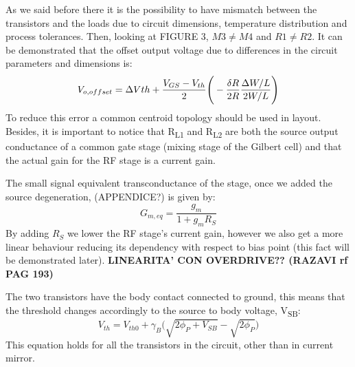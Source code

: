 As we said before there it is the possibility to have mismatch between the transistors and the loads due to circuit dimensions, temperature distribution and process tolerances. Then, looking at FIGURE 3, $M3 \neq M4$ and $R1 \neq R2$. It can be demonstrated that the offset output voltage due to differences in the circuit parameters and dimensions is:
\begin{equation}
V_{o,offset}= \Delta V{th}+\frac{V_{GS}-V_{th}}{2}\Bigg(-\frac{\delta R}{2R}\frac{\Delta W /L}{2W/L}\Bigg) \notag
\end{equation}
To reduce this error a common centroid topology should be used in layout.
Besides, it is important to notice that R\textsubscript{L1} and R\textsubscript{L2} are both the source output conductance of a common gate stage (mixing stage of the Gilbert cell) and that the actual gain for the RF stage is a current gain. 

The small signal equivalent transconductance of the stage, once we added the source degeneration, (APPENDICE?) is given by:
\begin{equation}
\label{eq_degenGain}
G_{m,eq} = \frac{g_m}{1+g_m R_S}
\end{equation}
By adding $R_S$ we lower the RF stage's current gain, however  we also get a more linear behaviour reducing its dependency with respect to bias point (this fact will be demonstrated later). \textbf{LINEARITA' CON OVERDRIVE?? (RAZAVI rf PAG 193)}

The two transistors have the body contact connected to ground, this means that the threshold changes accordingly to the source to body voltage, V\textsubscript{SB}:
\begin{equation}
\label{eq_thresholdV}
V_{th} = V_{th0}+\gamma_B\big(\sqrt{2\phi_P + V_{SB}}-\sqrt{2\phi_P}\big)
\end{equation}
This equation holds for all the transistors in the circuit, other than in current mirror.


